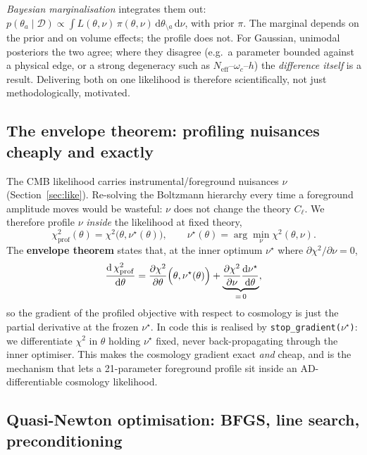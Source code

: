 \documentclass[11pt]{article}
\newcommand{\code}[1]{\texttt{\small #1}}
\newcommand{\Neff}{N_{\mathrm{eff}}}
\newcommand{\Cl}{C_\ell}
\newcommand{\chisq}{\chi^2}
\begin{document}
\emph{Bayesian marginalisation} integrates them out:
$p(\theta_a\mid\mathcal D)\propto\int
L(\theta,\nu)\,\pi(\theta,\nu)\,\mathrm d\theta_{\setminus a}\,\mathrm d\nu$,
with prior $\pi$. The marginal depends on the prior and on volume effects;
the profile does not. For Gaussian, unimodal posteriors the two agree;
where they disagree (e.g.\ a parameter bounded against a physical edge,
or a strong degeneracy such as $\Neff$--$\omega_c$--$h$) the
\emph{difference itself} is a result. Delivering both on one likelihood is
therefore scientifically, not just methodologically, motivated.

\subsection{The envelope theorem: profiling nuisances cheaply and exactly}
\label{sec:envelope}

The CMB likelihood carries instrumental/foreground nuisances $\nu$
(Section~\ref{sec:like}). Re-solving the Boltzmann hierarchy every time a
foreground amplitude moves would be wasteful: $\nu$ does not change the
theory $\Cl$. We therefore profile $\nu$ \emph{inside} the likelihood at
fixed theory,
\begin{equation}
\chisq_{\mathrm{prof}}(\theta)=\chisq\bigl(\theta,\nu^\star(\theta)\bigr),
\qquad
\nu^\star(\theta)=\arg\min_\nu\chisq(\theta,\nu).
\end{equation}
The \textbf{envelope theorem} states that, at the inner optimum
$\nu^\star$ where $\partial\chisq/\partial\nu=0$,
\begin{equation}
\frac{\mathrm d\,\chisq_{\mathrm{prof}}}{\mathrm d\theta}
=\frac{\partial\chisq}{\partial\theta}\Bigl(\theta,\nu^\star(\theta)\Bigr)
+\underbrace{\frac{\partial\chisq}{\partial\nu}\frac{\mathrm
d\nu^\star}{\mathrm d\theta}}_{=\,0},
\end{equation}
so the gradient of the profiled objective with respect to cosmology is
just the partial derivative at the frozen $\nu^\star$. In code this is
realised by \code{stop\_gradient($\nu^\star$)}: we differentiate
$\chisq$ in $\theta$ holding $\nu^\star$ fixed, never back-propagating
through the inner optimiser. This makes the cosmology gradient exact
\emph{and} cheap, and is the mechanism that lets a 21-parameter
foreground profile sit inside an AD-differentiable cosmology likelihood.

\subsection{Quasi-Newton optimisation: BFGS, line search, preconditioning}
\label{sec:bfgs}
\end{document}
